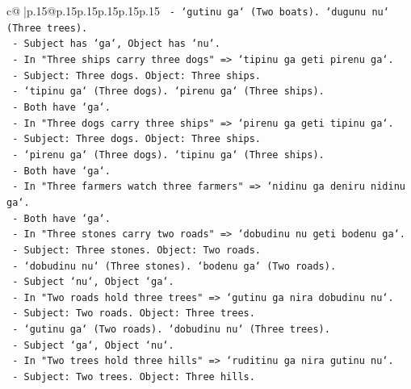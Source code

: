 \documentclass{article}
\begin{document}
{\begin{supertabular}{c@{$\;$}|p{.15\linewidth}@{}p{.15\linewidth}p{.15\linewidth}p{.15\linewidth}p{.15\linewidth}p{.15\linewidth}}
{{{\texttt{                 {-} `gutinu ga` (Two boats). `dugunu nu` (Three trees).} \\
\texttt{                 {-} Subject has `ga`, Object has `nu`.} \\
\texttt{               {-} In "Three ships carry three dogs" => `tipinu ga geti pirenu ga`.} \\
\texttt{                 {-} Subject: Three dogs. Object: Three ships.} \\
\texttt{                 {-} `tipinu ga` (Three dogs). `pirenu ga` (Three ships).} \\
\texttt{                 {-} Both have `ga`.} \\
\texttt{               {-} In "Three dogs carry three ships" => `pirenu ga geti tipinu ga`.} \\
\texttt{                 {-} Subject: Three dogs. Object: Three ships.} \\
\texttt{                 {-} `pirenu ga` (Three dogs). `tipinu ga` (Three ships).} \\
\texttt{                 {-} Both have `ga`.} \\
\texttt{               {-} In "Three farmers watch three farmers" => `nidinu ga deniru nidinu ga`.} \\
\texttt{                 {-} Both have `ga`.} \\
\texttt{               {-} In "Three stones carry two roads" => `dobudinu nu geti bodenu ga`.} \\
\texttt{                 {-} Subject: Three stones. Object: Two roads.} \\
\texttt{                 {-} `dobudinu nu` (Three stones). `bodenu ga` (Two roads).} \\
\texttt{                 {-} Subject `nu`, Object `ga`.} \\
\texttt{               {-} In "Two roads hold three trees" => `gutinu ga nira dobudinu nu`.} \\
\texttt{                 {-} Subject: Two roads. Object: Three trees.} \\
\texttt{                 {-} `gutinu ga` (Two roads). `dobudinu nu` (Three trees).} \\
\texttt{                 {-} Subject `ga`, Object `nu`.} \\
\texttt{               {-} In "Two trees hold three hills" => `ruditinu ga nira gutinu nu`.} \\
\texttt{                 {-} Subject: Two trees. Object: Three hills.} \\
}}}
\end{supertabular}}
\end{document}
